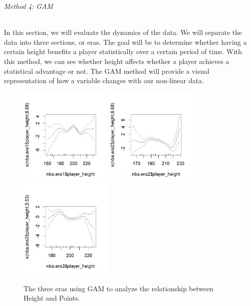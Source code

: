 \documentclass[11pt,letterpaper]{amsart}
\begin{document}
\newpage
\begin{center}
\emph{{\LARGE Method 4: GAM}}
\end{center} \leavevmode\\
\indent In this section, we will evaluate the dynamics of the data. We will separate the data into three sections, or eras. The goal will be to determine whether having a certain height benefits a player statistically over a certain period of time. With this method, we can see whether height affects whether a player achieves a statistical advantage or not. The GAM method will provide a visual representation of how a variable changes with our non-linear data.
\begin{figure}[H] 
\includegraphics[width=0.4\textwidth]{Era1PTS}\hspace{1cm}
\includegraphics[width=0.4\textwidth]{Era2PTS}\hspace{1cm}
\includegraphics[width=0.4\textwidth]{Era3PTS}\hspace{1cm}
\caption{The three eras using GAM to analyze the relationship between Height and Points. \label{fig3}}
\end{figure} \leavevmode
\end{document}
